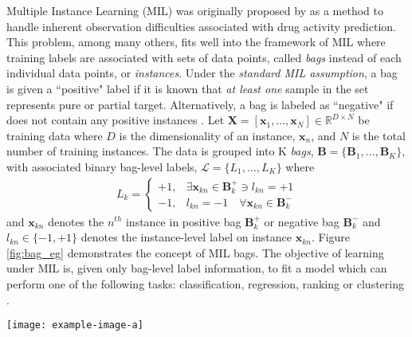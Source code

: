 Multiple Instance Learning (MIL) was originally proposed by \cite{Dietterich1996AxisParallelRectangles} as a method to handle inherent observation difficulties associated with drug activity prediction.  This problem, among many others, fits well into the framework of MIL where training labels are associated with sets of data points, called \textit{bags} instead of each individual data points, or \textit{instances}.  Under the \textit{standard MIL assumption}, a bag is given a ``positive" label if it is known that  \textit{at least one} sample in the set represents pure or partial target.  Alternatively, a bag is labeled as ``negative" if does not contain any positive instances \citep{Carbonneau2016MILSurvey}.  Let $\bm{X}=[\bm{x}_1,\dots, \bm{x}_N] \in \mathbb{R}^{D \times N}$ be training data where $D$ is the dimensionality of an instance, $\bm{x}_n$, and $N$ is the total number of training instances.  The data is grouped into K \textit{bags}, $\bm{B} = \{\bm{B}_1, \dots, \bm{B}_K\}$, with associated binary bag-level labels, $\mathcal{L} = \{L_1, \dots, L_K \}$ where 
\begin{align}
	L_k = \begin{cases} 
	+1, & \exists \bm{x}_{kn} \in \bm{B}^{+}_{k} \ni  l_{kn} = +1\\
	-1, & l_{kn} = -1 \quad \forall \bm{x}_{kn} \in \bm{B}^{-}_{k} 
	\end{cases}
\end{align} and $\bm{x}_{kn}$ denotes the $n^{th}$ instance in positive bag $\bm{B}^{+}_{k}$ or negative bag $\bm{B}^{-}_{k}$ \citep{Zare2016MIACE} and $l_{kn} \in \{ -1, +1\}$ denotes the instance-level label on instance $\bm{x}_{kn}$.  Figure \ref{fig:bag_eg} demonstrates the concept of MIL bags.  The objective of learning under MIL is, given only bag-level label information, to fit a model which can perform one of the following tasks: classification, regression, ranking or clustering \citep{Carbonneau2016MILSurvey}.

\begin{center}
	\begin{figure*}[h]
		\centering
		\texttt{[image: example-image-a]}
		\caption[Multiple instance learning bags.]{Placeholder for examples of positive and negative bag concepts}
		\label{fig:bag_eg}
	\end{figure*}
\end{center}

\noindent

